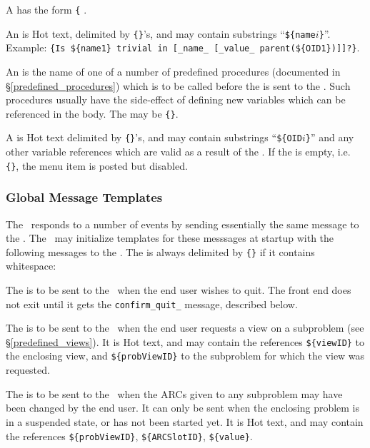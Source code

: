 A  has the form
{\tt\{}  .

An  is {\sf Hot} text, delimited by {\tt\{\}}'s, and may
contain substrings ``{\tt \$\{name}$i${\tt\}}''. Example:\break
{\tt\{Is \$\{name1\} trivial in [\_name\_ [\_value\_ parent(\$\{OID1\})]]?\}}.

An  is the name of one of a number of predefined
procedures (documented in \S\ref{predefined_procedures}) which is to
be called before the  is sent to the \SM. Such
procedures usually have the side-effect of defining new variables
which can be referenced in the  body. The 
may be {\tt\{\}}.

A  is {\sf Hot} text delimited by {\tt\{\}}'s, and may
contain substrings ``{\tt \$\{OID}$i${\tt\}}'' and any other variable
references which are valid as a result of the . If the
 is empty, i.e. {\tt\{\}}, the menu item is posted but
disabled.


\subsubsection{Global Message Templates}\label{global_defns}

The \FE\ responds to a number of events by sending essentially the
same message to the \SM. The \SM\ may initialize templates for these
messsages at startup with the following messages to the \FE. The
 is always delimited by {\tt\{\}} if it contains
whitespace:


The  is to be sent to the \SM\ when the end user wishes
to quit. The front end does not exit until it gets the
{\tt confirm\_quit\_} message, described below.


The  is to be sent to the \SM\ when the end user
requests a view on a subproblem (see \S\ref{predefined_views}).  It is
{\sf Hot} text, and may contain the references {\tt\$\{viewID\}} to
the enclosing view, and {\tt\$\{probViewID\}} to the subproblem for
which the view was requested.


The  is to be sent to the \SM\ when the ARCs given to
any subproblem may have been changed by the end user.  It can only be
sent when the enclosing problem is in a suspended state, or has not
been started yet. It is {\sf Hot} text, and may contain the references
{\tt\$\{probViewID\}}, {\tt\$\{ARCSlotID\}}, {\tt\$\{value\}}.

